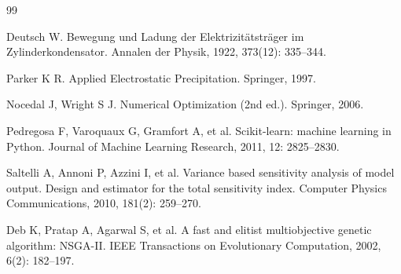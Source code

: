 
\begin{thebibliography}{99}

 Deutsch W. Bewegung und Ladung der Elektrizit\"atstr\"ager im Zylinderkondensator. Annalen der Physik, 1922, 373(12): 335--344.

 Parker K R. Applied Electrostatic Precipitation. Springer, 1997.

 Nocedal J, Wright S J. Numerical Optimization (2nd ed.). Springer, 2006.

 Pedregosa F, Varoquaux G, Gramfort A, et al. Scikit-learn: machine learning in Python. Journal of Machine Learning Research, 2011, 12: 2825--2830.

 Saltelli A, Annoni P, Azzini I, et al. Variance based sensitivity analysis of model output. Design and estimator for the total sensitivity index. Computer Physics Communications, 2010, 181(2): 259--270.

 Deb K, Pratap A, Agarwal S, et al. A fast and elitist multiobjective genetic algorithm: NSGA-II. IEEE Transactions on Evolutionary Computation, 2002, 6(2): 182--197.

\end{thebibliography}
